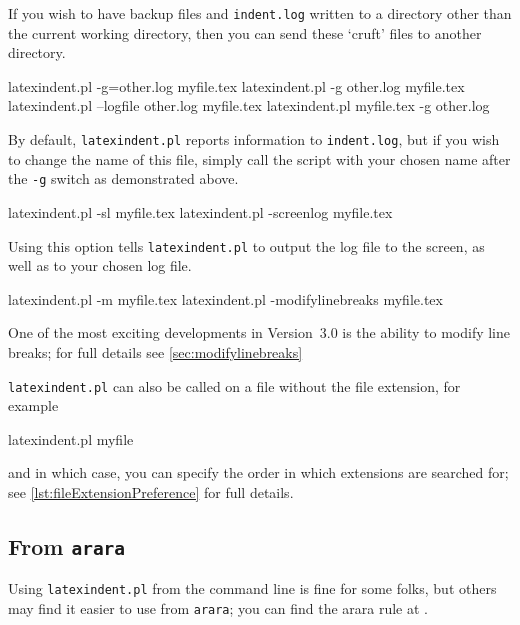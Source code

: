 	If you wish to have backup files and \texttt{indent.log} written to a directory other than the current working directory, then you can send these `cruft' files to another directory.

	\begin{commandshell}
latexindent.pl -g=other.log myfile.tex
latexindent.pl -g other.log myfile.tex
latexindent.pl --logfile other.log myfile.tex
latexindent.pl myfile.tex -g other.log 
      \end{commandshell}

	By default, \texttt{latexindent.pl} reports information to \texttt{indent.log}, but if you wish to change the name of this file, simply call the script with your chosen name after the \texttt{-g} switch as demonstrated above.

	\begin{commandshell}
latexindent.pl -sl myfile.tex
latexindent.pl -screenlog myfile.tex
      \end{commandshell}
	Using this option tells \texttt{latexindent.pl} to output the log file to the screen, as well as to your chosen log file.

	\begin{commandshell}
latexindent.pl -m myfile.tex
latexindent.pl -modifylinebreaks myfile.tex
      \end{commandshell}

	One of the most exciting developments in Version~3.0 is the ability to modify line breaks; for full details see \vref{sec:modifylinebreaks} 

	\texttt{latexindent.pl} can also be called on a file without the file extension, for example \begin{commandshell}
latexindent.pl myfile
    \end{commandshell} and in which case, you can specify the order in which extensions are searched for; see \vref{lst:fileExtensionPreference} for full details.

\subsection{From \texttt{arara}}
	\label{sec:arara}
	Using \texttt{latexindent.pl} from the command line is fine for some folks, but others may find it easier to use from \texttt{arara}; you can find the arara rule at \cite{paulo}.

